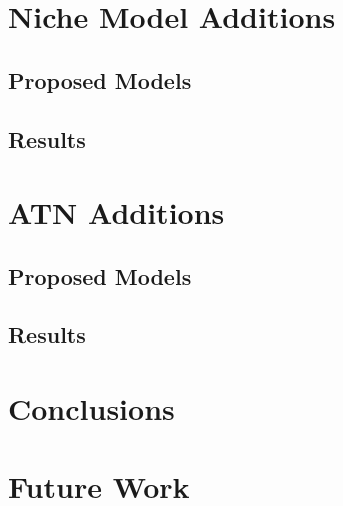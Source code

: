 \documentclass{beamer}
\begin{document}
\section{Niche Model Additions}

\subsection{Proposed Models}

\subsection{Results}

\section{ATN Additions}





\subsection{Proposed Models}

\subsection{Results}

\section{Conclusions}

\section{Future Work}
\end{document}
